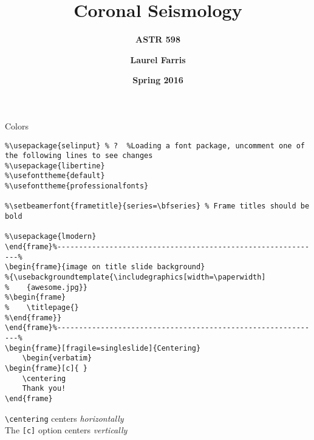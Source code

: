 \documentclass[9pt]{beamer}
\title{\textbf{Coronal Seismology}}
\subtitle{\textbf{ASTR 598}}
\date{\textbf{Spring 2016}}
\author{\textbf{Laurel Farris}}
\begin{document}
\begin{frame}[fragile=singleslide]{Colors}
\begin{verbatim}
%\usepackage{selinput} % ?  %Loading a font package, uncomment one of the following lines to see changes
%\usepackage{libertine}
%\usefonttheme{default}
%\usefonttheme{professionalfonts}

%\setbeamerfont{frametitle}{series=\bfseries} % Frame titles should be bold

%\usepackage{lmodern}
\end{frame}%-------------------------------------------------------------%
\begin{frame}{image on title slide background}
%{\usebackgroundtemplate{\includegraphics[width=\paperwidth]
%    {awesome.jpg}}
%\begin{frame}
%    \titlepage{}
%\end{frame}}
\end{frame}%-------------------------------------------------------------%
\begin{frame}[fragile=singleslide]{Centering}
    \begin{verbatim}
\begin{frame}[c]{ }
    \centering
    Thank you!
\end{frame}
    \end{verbatim}

    \verb|\centering| centers \emph{horizontally}\\
    The \verb|[c]| option centers \emph{vertically}
\end{frame}%
\end{document}
